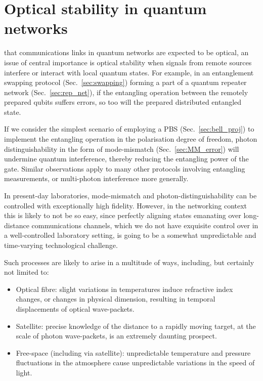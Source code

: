 %
%

\section{Optical stability in quantum networks} \label{sec:opt_stab} 

 that communications links in quantum networks are expected to be optical, an issue of central importance is optical stability when signals from remote sources interfere or interact with local quantum states. For example, in an entanglement swapping protocol (Sec.~\ref{sec:swapping}) forming a part of a quantum repeater network (Sec.~\ref{sec:rep_net}), if the entangling operation between the remotely prepared qubits suffers errors, so too will the prepared distributed entangled state.

If we consider the simplest scenario of employing a PBS (Sec.~\ref{sec:bell_proj}) to implement the entangling operation in the polarisation degree of freedom, photon distinguishability in the form of mode-mismatch (Sec.~\ref{sec:MM_error}) will undermine quantum interference, thereby reducing the entangling power of the gate. Similar observations apply to many other protocols involving entangling measurements, or multi-photon interference more generally.

In present-day laboratories, mode-mismatch and photon-distinguishability can be controlled with exceptionally high fidelity. However, in the networking context this is likely to not be so easy, since perfectly aligning states emanating over long-distance communications channels, which we do not have exquisite control over in a well-controlled laboratory setting, is going to be a somewhat unpredictable and time-varying technological challenge.

Such processes are likely to arise in a multitude of ways, including, but certainly not limited to:
\begin{itemize}
	\item Optical fibre: slight variations in temperatures induce refractive index changes, or changes in physical dimension, resulting in temporal displacements of optical wave-packets.
	\item Satellite: precise knowledge of the distance to a rapidly moving target, at the scale of photon wave-packets, is an extremely daunting prospect.
	\item Free-space (including via satellite): unpredictable temperature and pressure fluctuations in the atmosphere cause unpredictable variations in the speed of light.
\end{itemize}


